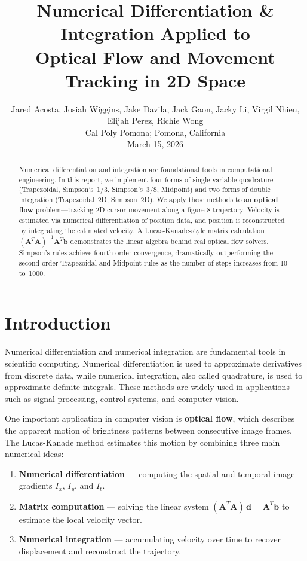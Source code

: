 \documentclass[letterpaper,twocolumn,fleqn]{article}
\title{Numerical Differentiation \& Integration Applied to\\
  Optical Flow and Movement Tracking in 2D Space}
\author{ Jared Acosta, Josiah Wiggins, Jake Davila, Jack Gaon, Jacky Li, Virgil Nhieu, Elijah Perez, Richie Wong\\ Cal Poly Pomona; Pomona, California \\ March 15, 2026}
\begin{document}
 
\maketitle 
\thispagestyle{empty}


\begin{abstract}
Numerical differentiation and integration are foundational tools in
computational engineering.  In this report, we implement four forms of
single-variable quadrature (Trapezoidal, Simpson's~1/3, Simpson's~3/8,
Midpoint) and two forms of double integration (Trapezoidal~2D, Simpson~2D).
We apply these methods to an \textbf{optical flow} problem---tracking 2D
cursor movement along a figure-8 trajectory.  Velocity is estimated via
numerical differentiation of position data, and position is reconstructed by
integrating the estimated velocity.  A Lucas-Kanade-style matrix calculation
$(\mathbf{A}^T\mathbf{A})^{-1}\mathbf{A}^T\mathbf{b}$ demonstrates the
linear algebra behind real optical flow solvers.  Simpson's rules achieve
fourth-order convergence, dramatically outperforming the second-order
Trapezoidal and Midpoint rules as the number of steps increases from 10
to~1000.
\end{abstract}


\section{Introduction}

Numerical differentiation and numerical integration are fundamental tools in scientific computing. Numerical differentiation is used to approximate derivatives from discrete data, while numerical integration, also called quadrature, is used to approximate definite integrals. These methods are widely used in applications such as signal processing, control systems, and computer vision.

One important application in computer vision is \textbf{optical flow}, which describes the apparent motion of brightness patterns between consecutive image frames. The Lucas-Kanade method estimates this motion by combining three main numerical ideas:
\begin{enumerate}
  \item \textbf{Numerical differentiation} --- computing the spatial and temporal image gradients $I_x$, $I_y$, and $I_t$.
  \item \textbf{Matrix computation} --- solving the linear system $(\mathbf{A}^T\mathbf{A})\,\mathbf{d} = \mathbf{A}^T\mathbf{b}$ to estimate the local velocity vector.
  \item \textbf{Numerical integration} --- accumulating velocity over time to recover displacement and reconstruct the trajectory.
\end{enumerate}
\end{document}
